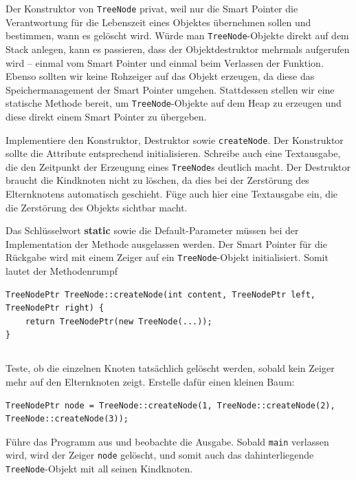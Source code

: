 Der Konstruktor von \texttt{TreeNode} privat, weil nur die Smart Pointer die Verantwortung für die Lebenszeit eines Objektes übernehmen sollen und bestimmen, wann es gelöscht wird.
Würde man \texttt{TreeNode}-Objekte direkt auf dem Stack anlegen, kann es passieren, dass der Objektdestruktor mehrmals aufgerufen wird -- einmal vom Smart Pointer und einmal beim Verlassen der Funktion.
Ebenso sollten wir keine Rohzeiger auf das Objekt erzeugen, da diese das Speichermanagement der Smart Pointer umgehen.
Stattdessen stellen wir eine statische Methode bereit, um \texttt{TreeNode}-Objekte auf dem Heap zu erzeugen und diese direkt einem Smart Pointer zu übergeben.

Implementiere den Konstruktor, Destruktor sowie \texttt{createNode}.
Der Konstruktor sollte die Attribute entsprechend initialisieren.
Schreibe auch eine Textausgabe, die den Zeitpunkt der Erzeugung eines \texttt{TreeNode}s deutlich macht.
Der Destruktor braucht die Kindknoten nicht zu löschen, da dies bei der Zerstörung des Elternknotens automatisch geschieht.
Füge auch hier eine Textausgabe ein, die die Zerstörung des Objekts sichtbar macht.

Das Schlüsselwort \textbf{static} sowie die Default-Parameter müssen bei der Implementation der Methode ausgelassen werden.
Der Smart Pointer für die Rückgabe wird mit einem Zeiger auf ein \texttt{TreeNode}-Objekt initialisiert. Somit lautet der Methodenrumpf

\begin{lstlisting}
TreeNodePtr TreeNode::createNode(int content, TreeNodePtr left, TreeNodePtr right) {
	return TreeNodePtr(new TreeNode(...));
}
\end{lstlisting}

\subsection{}
Teste, ob die einzelnen Knoten tatsächlich gelöscht werden, sobald kein Zeiger mehr auf den Elternknoten zeigt.
Erstelle dafür einen kleinen Baum:

\begin{lstlisting}
TreeNodePtr node = TreeNode::createNode(1, TreeNode::createNode(2), TreeNode::createNode(3));
\end{lstlisting}

Führe das Programm aus und beobachte die Ausgabe.
Sobald \texttt{main} verlassen wird, wird der Zeiger \texttt{node} gelöscht, und somit auch das dahinterliegende \texttt{TreeNode}-Objekt mit all seinen Kindknoten.

